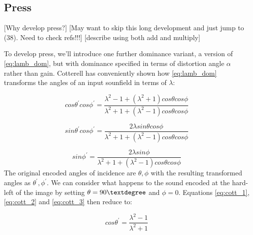 \documentclass[12pt]{article}
\begin{document}
\subsection{Press}

[Why develop press?] [May want to skip this long development and just jump to (38). Need to check refs!!!] [describe using both add and multiply]

To develop press, we'll introduce one further dominance variant, a version of \eqref{eq:lamb_dom}, but with dominance specified in terms of distortion angle \(\alpha\) rather than gain. Cotterell \cite{cotterell:02} has conveniently shown how \eqref{eq:lamb_dom} transforms the angles of an input sounfield in terms of \(\lambda\):

\begin{equation}		\label{eq:cott_1}
	cos\theta^\prime cos\phi^\prime = \frac{\lambda^2 -1 +(\lambda^2 +1)cos\theta cos\phi}{\lambda^2 +1 +(\lambda^2 -1)cos\theta cos\phi}
\end{equation}

\begin{equation}		\label{eq:cott_2}
	sin\theta^\prime cos\phi^\prime = \frac{2\lambda sin\theta cos\phi}{\lambda^2 +1 +(\lambda^2 -1)cos\theta cos\phi}
\end{equation}

\begin{equation}		\label{eq:cott_3}
	sin\phi^\prime = \frac{2\lambda sin\phi}{\lambda^2 +1 +(\lambda^2 -1)cos\theta cos\phi}\end{equation}The original encoded angles of incidence are \(\theta, \phi\) with the resulting transformed angles as \(\theta^\prime, \phi^\prime\). We can consider what happens to the sound encoded at the hard-left of the image by setting \(\theta = 90\textdegree\) and \(\phi = 0\). Equations \eqref{eq:cott_1}, \eqref{eq:cott_2} and \eqref{eq:cott_3} then reduce to:

\begin{equation}		\label{eq:cott_4}
	cos\theta^\prime = \frac{\lambda^2 -1}{\lambda^2 +1}
\end{equation}
\end{document}
